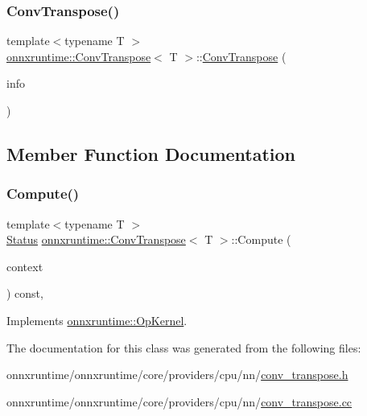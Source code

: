 \subsubsection{\texorpdfstring{Conv\+Transpose()}{ConvTranspose()}}
{\footnotesize\ttfamily template$<$typename T $>$ \\
\mbox{\hyperlink{classonnxruntime_1_1ConvTranspose}{onnxruntime\+::\+Conv\+Transpose}}$<$ T $>$\+::\mbox{\hyperlink{classonnxruntime_1_1ConvTranspose}{Conv\+Transpose}} (\begin{DoxyParamCaption}\item[{const \mbox{\hyperlink{classonnxruntime_1_1OpKernelInfo}{Op\+Kernel\+Info}} \&}]{info }\end{DoxyParamCaption})\hspace{0.3cm}{\ttfamily [inline]}}



\subsection{Member Function Documentation}
\mbox{\label{classonnxruntime_1_1ConvTranspose_aaf4f2e7fec38e9f0f1a042e8d05b006e}} 
\subsubsection{\texorpdfstring{Compute()}{Compute()}}
{\footnotesize\ttfamily template$<$typename T $>$ \\
\mbox{\hyperlink{classonnxruntime_1_1common_1_1Status}{Status}} \mbox{\hyperlink{classonnxruntime_1_1ConvTranspose}{onnxruntime\+::\+Conv\+Transpose}}$<$ T $>$\+::Compute (\begin{DoxyParamCaption}\item[{\mbox{\hyperlink{classonnxruntime_1_1OpKernelContext}{Op\+Kernel\+Context}} $\ast$}]{context }\end{DoxyParamCaption}) const\hspace{0.3cm}{\ttfamily [override]}, {\ttfamily [virtual]}}



Implements \mbox{\hyperlink{classonnxruntime_1_1OpKernel_a9eca8656a78b1b3ab9d3351a12798650}{onnxruntime\+::\+Op\+Kernel}}.



The documentation for this class was generated from the following files\+:\begin{DoxyCompactItemize}
\item 
onnxruntime/onnxruntime/core/providers/cpu/nn/\mbox{\hyperlink{cpu_2nn_2conv__transpose_8h}{conv\+\_\+transpose.\+h}}\item 
onnxruntime/onnxruntime/core/providers/cpu/nn/\mbox{\hyperlink{cpu_2nn_2conv__transpose_8cc}{conv\+\_\+transpose.\+cc}}\end{DoxyCompactItemize}
